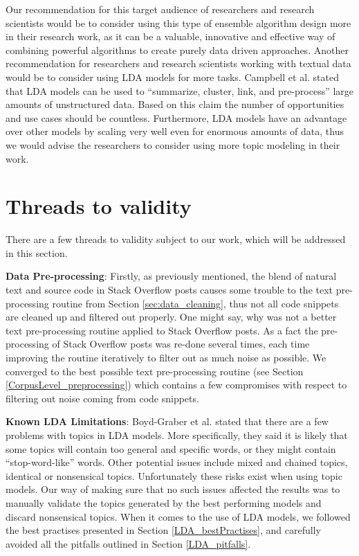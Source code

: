             Our recommendation for this target audience of researchers and research scientists would be to consider using this type of ensemble algorithm design more in their research work, as it can be a valuable, innovative and effective way of combining powerful algorithms to create purely data driven approaches. Another recommendation for researchers and research scientists working with textual data would be to consider using LDA models for more tasks. Campbell et al. \cite{campbell2015latent} stated that LDA models can be used to ``summarize, cluster, link, and pre-process'' large amounts of unstructured data. Based on this claim the number of opportunities and use cases should be countless. Furthermore, LDA models have an advantage over other models by scaling very well even for enormous amounts of data, thus we would advise the researchers to consider using more topic modeling in their work.
        
    \section{Threads to validity\label{sec:validity}}
    
        There are a few threads to validity subject to our work, which will be addressed in this section.
        
        \textbf{Data Pre-processing}:  Firstly, as previously mentioned, the blend of natural text and source code in Stack Overflow posts causes some trouble to the text pre-processing routine from Section \ref{sec:data_cleaning}, thus not all code snippets are cleaned up and filtered out properly. One might say, why was not a better text pre-processing routine applied to Stack Overflow posts. As a fact the pre-processing of Stack Overflow posts was re-done several times, each time improving the routine iteratively to filter out as much noise as possible. We converged to the best possible text pre-processing routine (see Section \ref{CorpusLevel_preprocessing}) which contains a few compromises with respect to filtering out noise coming from code snippets. 
        
        \textbf{Known LDA Limitations}: Boyd-Graber et al. \cite{boyd2014care} stated that there are a few problems with topics in LDA models. More specifically, they said it is likely that some topics will contain too general and specific words, or they might contain ``stop-word-like'' words. Other potential issues include mixed and chained topics, identical or nonsensical topics. Unfortunately these risks exist when using topic models. Our way of making sure that no such issues affected the results was to manually validate the topics generated by the best performing models and discard nonsensical topics. When it comes to the use of LDA models, we followed the best practises presented in Section \ref{LDA_bestPractises}, and carefully avoided all the pitfalls outlined in Section \ref{LDA_pitfalls}.
        
